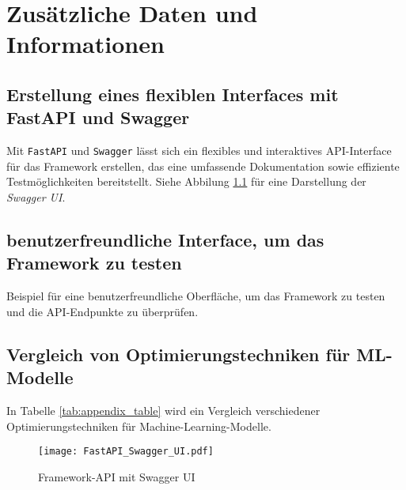 
\chapter{Zusätzliche Daten und Informationen}
\label{appendix_a}

\section{Erstellung eines flexiblen Interfaces mit FastAPI und Swagger}

Mit \texttt{FastAPI} und \texttt{Swagger} lässt sich ein flexibles und interaktives API-Interface für das 
Framework erstellen, das eine umfassende Dokumentation sowie effiziente Testmöglichkeiten bereitstellt.
Siehe Abbilung \ref{fig:Swagger_UI} für eine Darstellung der \textit{Swagger UI}.

\section{benutzerfreundliche Interface, um das Framework zu testen}

Beispiel für eine benutzerfreundliche Oberfläche, um das Framework zu testen und die API-Endpunkte zu überprüfen.

\section{Vergleich von Optimierungstechniken für ML-Modelle}

In Tabelle \ref{tab:appendix_table} wird ein Vergleich verschiedener Optimierungstechniken für Machine-Learning-Modelle.


\begin{figure}[h!]
    \centering
    \texttt{[image: FastAPI\_Swagger\_UI.pdf]} 
    \caption{Framework-API mit Swagger UI} 
    \label{fig:Swagger_UI} 
\end{figure}


